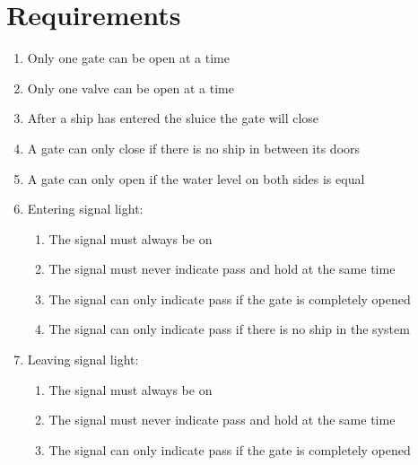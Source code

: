 \section{Requirements}
\begin{enumerate}
	\item Only one gate can be open at a time
	\item Only one valve can be open at a time
	\item After a ship has entered the sluice the gate will close
	\item A gate can only close if there is no ship in between its doors
	\item A gate can only open if the water level on both sides is equal
	\item Entering signal light:
		\begin{enumerate}
			\item The signal must always be on
			\item The signal must never indicate pass and hold at the same time
			\item The signal can only indicate pass if the gate is completely opened
			\item The signal can only indicate pass if there is no ship in the system
		\end{enumerate}
	\item Leaving signal light:
		\begin{enumerate}
			\item The signal must always be on
			\item The signal must never indicate pass and hold at the same time
			\item The signal can only indicate pass if the gate is completely opened
		\end{enumerate}
\end{enumerate}
